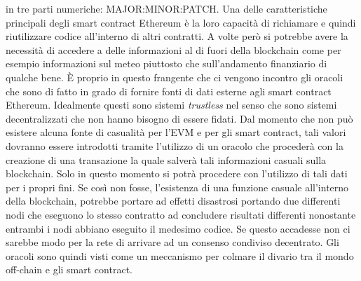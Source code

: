 in tre parti numeriche: MAJOR:MINOR:PATCH. Una delle caratteristiche principali degli smart contract Ethereum è la loro capacità di richiamare e quindi riutilizzare codice all'interno di altri contratti. A volte però si potrebbe avere la necessità di accedere a delle informazioni al di fuori della blockchain come per esempio informazioni sul meteo piuttosto che sull'andamento finanziario di qualche bene. \`E proprio in questo frangente che ci vengono incontro gli oracoli che sono di fatto in grado di fornire fonti di dati esterne agli smart contract Ethereum. Idealmente questi sono sistemi \textit{trustless} nel senso che sono sistemi decentralizzati che non hanno bisogno di essere fidati. Dal momento che non può esistere alcuna fonte di casualità per l'EVM e per gli smart contract, tali valori dovranno essere introdotti tramite l'utilizzo di un oracolo che procederà con la creazione di una transazione la quale salverà tali informazioni casuali sulla blockchain. Solo in questo momento si potrà procedere con l'utilizzo di tali dati per i propri fini. Se così non fosse, l'esistenza di una funzione casuale all'interno della blockchain, potrebbe portare ad effetti disastrosi portando due differenti nodi che eseguono lo stesso contratto ad concludere risultati differenti nonostante entrambi i nodi abbiano eseguito il medesimo codice. Se questo accadesse non ci sarebbe modo per la rete di arrivare ad un consenso condiviso decentrato. Gli oracoli sono quindi visti come un meccanismo per colmare il divario tra il mondo off-chain e gli smart contract.

